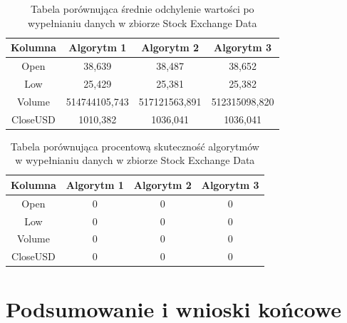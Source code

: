 \documentclass[12pt,twoside]{article}
\begin{document}
\begin{table}[ht]
    \caption{Tabela porównująca średnie odchylenie wartości po wypełnianiu danych w zbiorze Stock Exchange Data}
    \centering
    \begin{tabular}{|c|c|c|c|}
        \hline
        \textbf{Kolumna} & \textbf{Algorytm 1} & \textbf{Algorytm 2} & \textbf{Algorytm 3} \\ \hline
        Open             & 38,639              & 38,487              & 38,652              \\ \hline
        Low              & 25,429              & 25,381              & 25,382              \\ \hline
        Volume           & 514744105,743       & 517121563,891       & 512315098,820       \\ \hline
        CloseUSD         & 1010,382            & 1036,041            & 1036,041            \\ \hline
    \end{tabular}
    \label{tab:stock_aad}
\end{table}
\FloatBarrier

\begin{table}[ht]
    \caption{Tabela porównująca procentową skuteczność algorytmów w wypełnianiu danych w zbiorze Stock Exchange Data}
    \centering
    \begin{tabular}{|c|c|c|c|}
        \hline
        \textbf{Kolumna} & \textbf{Algorytm 1} & \textbf{Algorytm 2} & \textbf{Algorytm 3} \\ \hline
        Open             & 0                   & 0                   & 0                   \\ \hline
        Low              & 0                   & 0                   & 0                   \\ \hline
        Volume           & 0                   & 0                   & 0                   \\ \hline
        CloseUSD         & 0                   & 0                   & 0                   \\ \hline
    \end{tabular}
    \label{tab:stock_acc}
\end{table}
\FloatBarrier



\clearpage
\section{Podsumowanie i wnioski końcowe}
\end{document}
